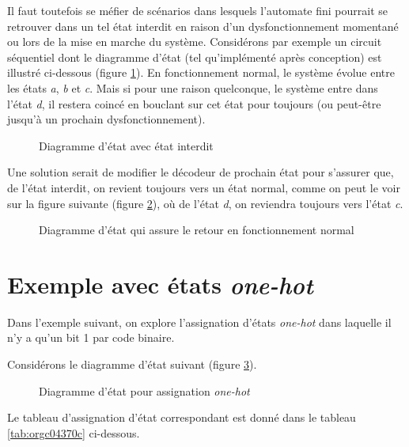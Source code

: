 \documentclass[letter, oneside]{book}
\begin{document}
Il faut toutefois se méfier de scénarios dans lesquels l'automate fini
pourrait se retrouver dans un tel état interdit en raison d'un
dysfonctionnement momentané ou lors de la mise en marche du
système. Considérons par exemple un circuit séquentiel dont le
diagramme d'état (tel qu'implémenté après conception) est illustré
ci-dessous (figure \ref{fig:orgec718f6}). En fonctionnement normal, le
système évolue entre les états \emph{a}, \emph{b} et \emph{c}. Mais si pour une
raison quelconque, le système entre dans l'état \emph{d}, il restera coincé
en bouclant sur cet état pour toujours (ou peut-être jusqu'à un
prochain dysfonctionnement).

\begin{figure}[htbp]
\centering

\caption{\label{fig:orgec718f6}Diagramme d'état avec état interdit}
\end{figure}


Une solution serait de modifier le décodeur de prochain état pour
s'assurer que, de l'état interdit, on revient toujours vers un état
normal, comme on peut le voir sur la figure suivante (figure
\ref{fig:orgecc1d63}), où de l'état \emph{d}, on reviendra toujours
vers l'état \emph{c}. 

\begin{figure}[htbp]
\centering

\caption{\label{fig:orgecc1d63}Diagramme d'état qui assure le retour en fonctionnement normal}
\end{figure}

\section{Exemple avec états \emph{one-hot}}
\label{sec:orgfe6824a}

Dans l'exemple suivant, on explore l'assignation d'états \emph{one-hot}
dans laquelle il n'y a qu'un bit 1 par code binaire.

Considérons le diagramme d'état suivant (figure \ref{fig:org16baf38}).

\begin{figure}[htbp]
\centering

\caption{\label{fig:org16baf38}Diagramme d'état pour assignation \emph{one-hot}}
\end{figure}

Le tableau d'assignation d'état correspondant est donné dans le
tableau \ref{tab:orgc04370c} ci-dessous.
\end{document}

